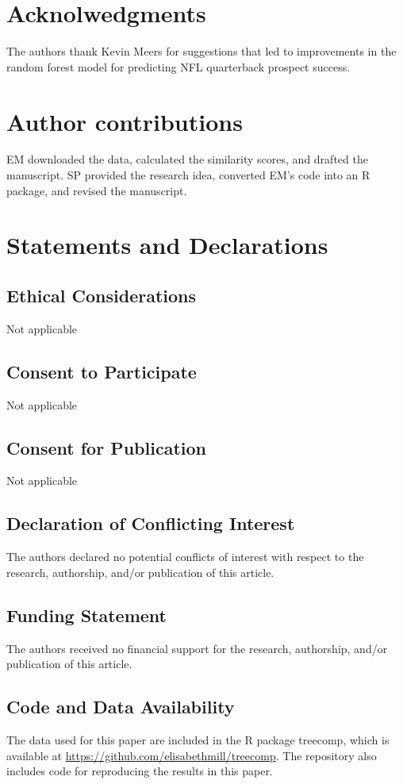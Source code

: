 \documentclass[Review, sageh, times]{sagej}
\begin{document}
\section{Acknolwedgments}

The authors thank Kevin Meers for suggestions that led to improvements in the random forest model for predicting NFL quarterback prospect success.

\section{Author contributions}

EM downloaded the data, calculated the similarity scores, and drafted the manuscript. SP provided the research idea, converted EM's code into an R package, and revised the manuscript.


\section{Statements and Declarations}
\subsection{Ethical Considerations}

Not applicable

\subsection{Consent to Participate}

Not applicable

\subsection{Consent for Publication}

Not applicable

\subsection{Declaration of Conflicting Interest}

The authors declared no potential conflicts of interest with respect to the research, authorship, and/or publication of this article.

\subsection{Funding Statement}

The authors received no financial support for the research, authorship, and/or publication of this article.

\subsection{Code and Data Availability}

The data used for this paper are included in the R package treecomp, which is available at \url{https://github.com/elisabethmill/treecomp}. The repository also includes code for reproducing the results in this paper.



\end{document}
